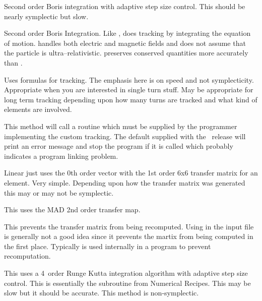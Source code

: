 \begin{description}
\item[\vn{Adaptive\_Boris}]
Second order Boris integration\cite{b:boris} with adaptive step size control.
This should be nearly symplectic but slow.

\item[\vn{Boris}]
Second order Boris Integration\cite{b:boris}. Like ,
 does tracking by integrating the equation of
motion.  handles both electric and magnetic fields and does
not assume that the particle is ultra--relativistic.  preserves
conserved quantities more accurately than .

\item[\vn{Bmad\_Standard}]
Uses formulas for tracking. The emphasis here is on speed and not
symplecticity. Appropriate when you are interested in single turn
stuff. May be appropriate for long term tracking depending upon how
many turns are tracked and what kind of elements are involved. 

\item[\vn{Custom}]
This method will call a routine  which must be
supplied by the programmer implementing the custom tracking. The
default  supplied with the \bmad\ release will print
an error message and stop the program if it is called which probably
indicates a program linking problem.

\item[\vn{Linear}]
Linear just uses the 0th order vector with the 1st order 6x6 transfer
matrix for an element. Very simple.  Depending upon how the transfer
matrix was generated this may or may not be symplectic.

\item[\vn{MAD}]
This uses the MAD 2nd order transfer map.

\item[\vn{None}]
This prevents the transfer matrix from being recomputed.
Using  in the input file is generally not a good idea since
it prevents the martix from being computed in the first place.
Typically  is used internally in a program to prevent recomputation.

\item[\vn{Runge\_Kutta}]
This uses a 4\Th\ order Runge Kutta integration algorithm with adaptive
step size control.  This is essentially the  subroutine
from Numerical Recipes\cite{b:nr}. This may be slow but it should be
accurate. This method is non-symplectic.


\end{description}
